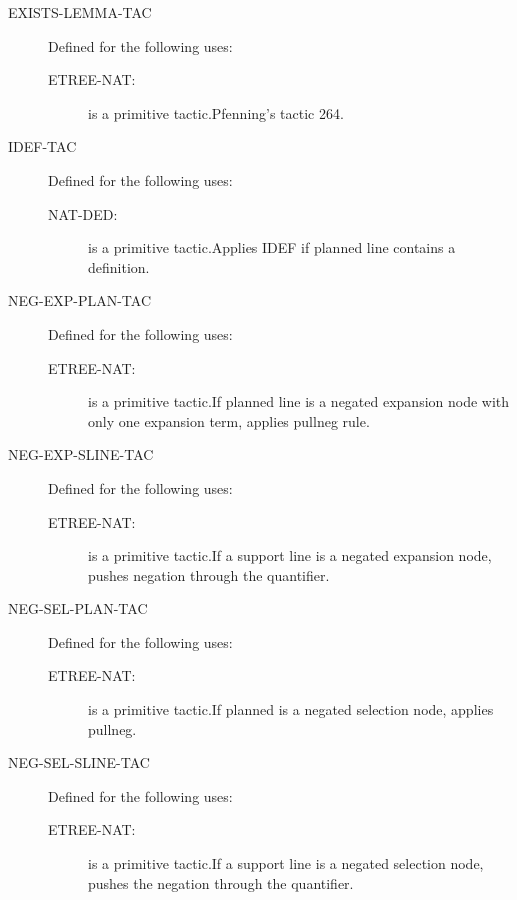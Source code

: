 \begin{description}
\begin{description}
\end{description}

\item[EXISTS-LEMMA-TAC]  Defined for the following uses:
\begin{description}
\item[ETREE-NAT:]  is a primitive tactic.Pfenning's tactic 264.

\end{description}

\item[IDEF-TAC]  Defined for the following uses:
\begin{description}
\item[NAT-DED:]  is a primitive tactic.Applies IDEF if planned line contains a definition.

\end{description}

\item[NEG-EXP-PLAN-TAC]  Defined for the following uses:
\begin{description}
\item[ETREE-NAT:]  is a primitive tactic.If planned line is a negated expansion node with only one expansion term,
applies pullneg rule.

\end{description}

\item[NEG-EXP-SLINE-TAC]  Defined for the following uses:
\begin{description}
\item[ETREE-NAT:]  is a primitive tactic.If a support line is a negated expansion node, pushes negation through
the quantifier.

\end{description}

\item[NEG-SEL-PLAN-TAC]  Defined for the following uses:
\begin{description}
\item[ETREE-NAT:]  is a primitive tactic.If planned is a negated selection node, applies pullneg.

\end{description}

\item[NEG-SEL-SLINE-TAC]  Defined for the following uses:
\begin{description}
\item[ETREE-NAT:]  is a primitive tactic.If a support line is a negated selection node, pushes the negation
through the quantifier.


\end{description}
\end{description}
